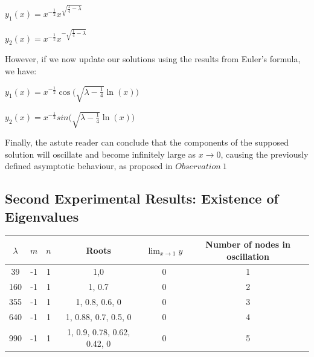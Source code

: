 \documentclass[executivepaper]{article}
\begin{document}
\begin{center}

$y_{1}(x)=x^{-\frac{1}{2}}x^{\sqrt{\frac{1}{4}-\lambda}}$

\hspace{1mm}

$y_{2}(x)=x^{-\frac{1}{2}}x^{-\sqrt{\frac{1}{4}-\lambda}}$

\end{center}

However, if we now update our solutions using the results from Euler's formula, we have:

\begin{center}

$y_{1}(x)=x^{-\frac{1}{2}}\cos\bigg(\sqrt{\lambda-\frac{1}{4}} \ln(x)\bigg)$

\hspace{1mm}

$y_{2}(x)=x^{-\frac{1}{2}}sin\bigg(\sqrt{\lambda-\frac{1}{4}} \ln(x)\bigg)$

\end{center}

Finally, the astute reader can conclude that the components of the supposed solution will oscillate and become infinitely large as $x \rightarrow 0$, causing the previously defined asymptotic behaviour, as proposed in $Observation \ 1$

\subsection*{Second Experimental Results: Existence of Eigenvalues}

\begin{tabular}{||c c c c c c||}

\hline

$\lambda$ & $m$ & $n$ & Roots & $\lim_{x \to 1} y$ & Number of nodes in oscillation \\ [0.5ex]

\hline\hline

39 & -1 & 1 & 1,0 & 0 & 1  \\ 

\hline

160 & -1 & 1 & 1, 0.7 & 0 & 2  \\

\hline

355 & -1 & 1 & 1, 0.8, 0.6, 0 & 0 & 3  \\

\hline

640 & -1 & 1 & 1, 0.88, 0.7, 0.5, 0 & 0 & 4  \\
\hline

990 & -1 & 1 & 1, 0.9, 0.78, 0.62, 0.42, 0 & 0 & 5 \\ [1ex]

\hline

\end{tabular}
\end{document}
